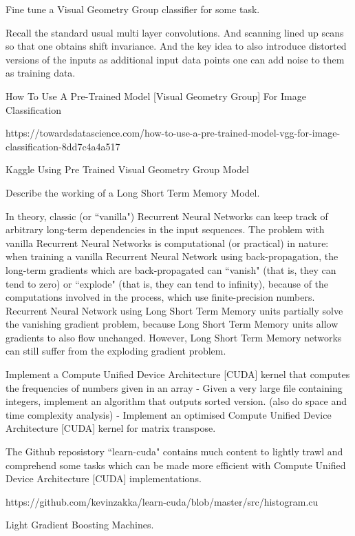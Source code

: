 Fine tune a Visual Geometry Group classifier for some task.

Recall the standard usual multi layer convolutions. And scanning lined up scans so that one obtains shift invariance. And the key idea to also introduce distorted versions of the inputs as additional input data points one can add noise to them as training data.

How To Use A Pre-Trained Model [Visual Geometry Group] For Image Classification

https://towardsdatascience.com/how-to-use-a-pre-trained-model-vgg-for-image-classification-8dd7c4a4a517

Kaggle Using Pre Trained Visual Geometry Group Model

Describe the working of a Long Short Term Memory Model.

In theory, classic (or ``vanilla") Recurrent Neural Networks can keep track of arbitrary long-term dependencies in the input sequences. The problem with vanilla Recurrent Neural Networks is computational (or practical) in nature: when training a vanilla Recurrent Neural Network using back-propagation, the long-term gradients which are back-propagated can ``vanish" (that is, they can tend to zero) or ``explode" (that is, they can tend to infinity), because of the computations involved in the process, which use finite-precision numbers. Recurrent Neural Network using Long Short Term Memory units partially solve the vanishing gradient problem, because Long Short Term Memory units allow gradients to also flow unchanged. However, Long Short Term Memory networks can still suffer from the exploding gradient problem.

Implement a Compute Unified Device Architecture [CUDA] kernel that computes the frequencies of numbers given in an array - Given a very large file containing integers, implement an algorithm that outputs sorted version. (also do space and time complexity analysis) - Implement an optimised Compute Unified Device Architecture [CUDA] kernel for matrix transpose.

The Github reposistory ``learn-cuda" contains much content to lightly trawl and comprehend some tasks which can be made more efficient with Compute Unified Device Architecture [CUDA] implementations.

https://github.com/kevinzakka/learn-cuda/blob/master/src/histogram.cu

Light Gradient Boosting Machines.

